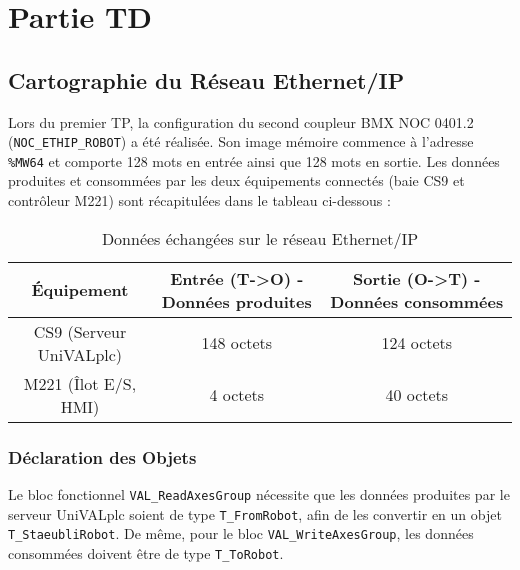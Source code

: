 \section{Partie TD}

\subsection{Cartographie du Réseau Ethernet/IP}

Lors du premier TP, la configuration du second coupleur BMX NOC 0401.2 (\texttt{NOC\_ETHIP\_ROBOT}) a été réalisée. Son image mémoire commence à l'adresse \texttt{\%MW64} et comporte 128 mots en entrée ainsi que 128 mots en sortie. Les données produites et consommées par les deux équipements connectés (baie CS9 et contrôleur M221) sont récapitulées dans le tableau ci-dessous :

\begin{table}[h]
\centering
\begin{tabular}{|c|c|c|}
\hline
\textbf{Équipement} & \textbf{Entrée (T->O) - Données produites} & \textbf{Sortie (O->T) - Données consommées} \\ \hline
CS9 (Serveur UniVALplc) & 148 octets & 124 octets \\ \hline
M221 (Îlot E/S, HMI) & 4 octets & 40 octets \\ \hline
\end{tabular}
\caption{Données échangées sur le réseau Ethernet/IP}
\end{table}

\begin{UPSTIactivite}

\vspace{13cm}
\end{UPSTIactivite}
\pagebreak

\subsubsection{Déclaration des Objets}

Le bloc fonctionnel \texttt{VAL\_ReadAxesGroup} nécessite que les données produites par le serveur UniVALplc soient de type \texttt{T\_FromRobot}, afin de les convertir en un objet \texttt{T\_StaeubliRobot}. De même, pour le bloc \texttt{VAL\_WriteAxesGroup}, les données consommées doivent être de type \texttt{T\_ToRobot}.

